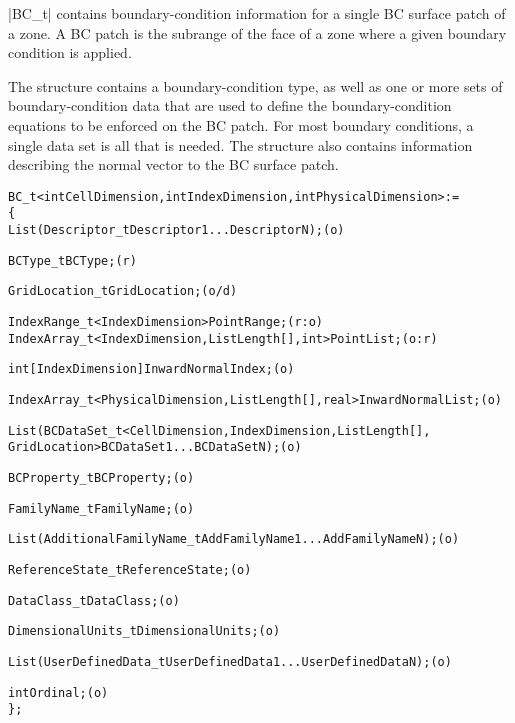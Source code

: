 |BC_t| contains boundary-condition information for a single BC surface
patch of a zone.
A BC patch is the subrange of the face of a zone where a given boundary
condition is applied.

The structure contains a boundary-condition type, as well as one or
more sets of boundary-condition data that are used to define the
boundary-condition equations to be enforced on the BC patch.  For most
boundary conditions, a single data set is all that is needed.  The
structure also contains information describing the normal vector to the
BC surface patch.

\begin{alltt}
  BC\_t< int CellDimension, int IndexDimension, int PhysicalDimension > :=
    \{
    List( Descriptor\_t Descriptor1 ... DescriptorN ) ;                      (o)

    BCType\_t BCType ;                                                       (r)

    GridLocation\_t GridLocation ;                                           (o/d)

    IndexRange\_t<IndexDimension> PointRange ;                               (r:o)
    IndexArray\_t<IndexDimension, ListLength[], int> PointList ;             (o:r)

    int[IndexDimension] InwardNormalIndex ;                                 (o)

    IndexArray\_t<PhysicalDimension, ListLength[], real> InwardNormalList ;  (o)

    List( BCDataSet\_t<CellDimension, IndexDimension, ListLength[],
          GridLocation> BCDataSet1 ... BCDataSetN ) ;                       (o)

    BCProperty\_t BCProperty ;                                               (o)

    FamilyName\_t FamilyName ;                                               (o)

    List( AdditionalFamilyName\_t AddFamilyName1 ... AddFamilyNameN ) ;      (o)

    ReferenceState\_t ReferenceState ;                                       (o)

    DataClass\_t DataClass ;                                                 (o)
                
    DimensionalUnits\_t DimensionalUnits ;                                   (o)

    List( UserDefinedData\_t UserDefinedData1 ... UserDefinedDataN ) ;       (o)

    int Ordinal ;                                                           (o)
    \} ;
\end{alltt}

